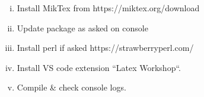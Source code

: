
\begin{enumerate}[(i)]
    \item Install MikTex from https://miktex.org/download
    \item Update package as asked on console
    \item Install perl if asked https://strawberryperl.com/ 
    \item Install VS code extension ``Latex Workshop``.
    \item Compile & check console logs.
\end{enumerate}